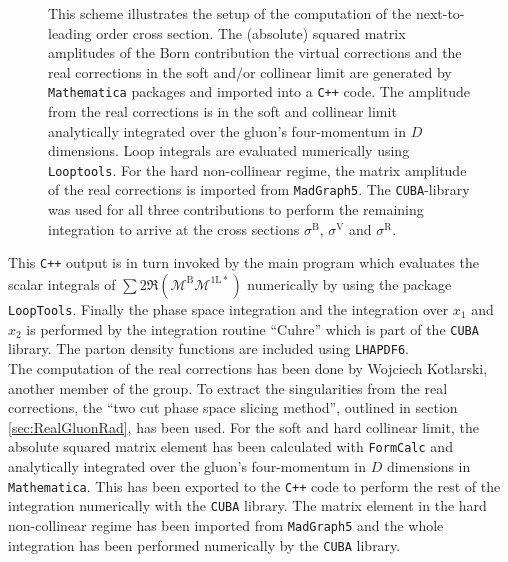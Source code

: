 \begin{figure}[H]
\begin{center}
\caption{This scheme illustrates the setup of the computation of the next-to-leading order cross section. The (absolute) squared matrix amplitudes of the Born contribution the virtual corrections and the real corrections in the soft and/or collinear limit are generated by \texttt{Mathematica} packages and imported into a \texttt{C++} code. The amplitude from the real corrections is in the soft and collinear limit analytically integrated over the gluon's four-momentum in $D$ dimensions. Loop integrals are evaluated numerically using \texttt{Looptools}. For the hard non-collinear regime, the matrix amplitude of the real corrections is imported from \texttt{MadGraph5}. The \texttt{CUBA}-library was used for all three contributions to perform the remaining integration to arrive at the cross sections $\sigma^{\mathrm{B}}$, $\sigma^{\mathrm{V}}$ and $\sigma^{\mathrm{R}}$.}\label{fig:CalcSetup}
\end{center}
\end{figure}
This \texttt{C++} output is in turn invoked by the main program which evaluates the scalar integrals of $ \sum 2\Re (\mathcal{M}^{\mathrm{B}} \mathcal{M}^{\mathrm{1L}\ast})$ numerically by using the package \texttt{LoopTools}. Finally the phase space integration and the integration over $x_1$ and $x_2$ is performed by the integration routine ``Cuhre'' which is part of the \texttt{CUBA} library\cite{Hahn:2004fe}. The parton density functions are included using \texttt{LHAPDF6}\cite{Buckley:2014ana}.\\
The computation of the real corrections has been done by Wojciech Kotlarski, another member of the group. To extract the singularities from the real corrections, the ``two cut phase space slicing method'', outlined in section \ref{sec:RealGluonRad}, has been used. For the soft and hard collinear limit, the absolute squared matrix element has been calculated with \texttt{FormCalc} and analytically integrated over the gluon's four-momentum in $D$ dimensions in \texttt{Mathematica}. This has been exported to the \texttt{C++} code to perform the rest of the integration numerically with the \texttt{CUBA} library. The matrix element in the hard non-collinear regime has been imported from \texttt{MadGraph5}\cite{Alwall:2014hca} and the whole integration has been performed numerically by the \texttt{CUBA} library.\\
